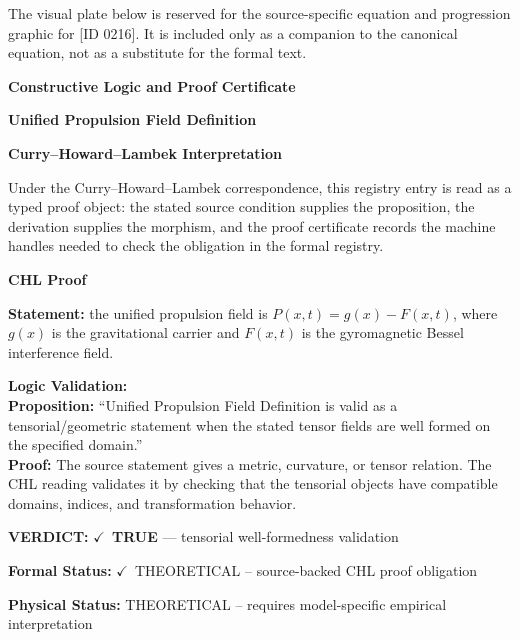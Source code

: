 \begingroup\footnotesize\sloppy
The visual plate below is reserved for the source-specific equation and progression graphic for [ID 0216]. It is included only as a companion to the canonical equation, not as a substitute for the formal text.
\par\endgroup
\ifTZPDarkEdition
{}
\fi

\clearpage
\begingroup\tzpsupportsetup
\noindent\textbf{\fontsize{10.8pt}{12.8pt}\selectfont [ID 0216] Constructive Logic and Proof Certificate}\par
\noindent\textbf{\fontsize{10pt}{12pt}\selectfont Unified Propulsion Field Definition}\par
\vspace{0.45em}
\begingroup
\footnotesize
\setlength{\parskip}{0.22em}
\setlength{\parindent}{0pt}
\noindent\textbf{Curry--Howard--Lambek Interpretation}\par
Under the Curry--Howard--Lambek correspondence, this registry entry is read as a typed proof
object: the stated source condition supplies the proposition, the derivation supplies the
morphism, and the proof certificate records the machine handles needed to check the obligation
in the formal registry.

\vspace{0.45em}
\noindent\textbf{CHL Proof}\par
\textbf{Statement:} the unified propulsion field is \(P(x,t)=g(x)-F(x,t)\), where \(g(x)\) is the gravitational carrier and \(F(x,t)\) is the gyromagnetic Bessel interference field.

\textbf{Logic Validation:}\\
\textbf{Proposition:} ``Unified Propulsion Field Definition is valid as a tensorial/geometric statement when the
stated tensor fields are well formed on the specified domain.''\\
\textbf{Proof:} The source statement gives a metric, curvature, or tensor relation. The CHL reading
validates it by checking that the tensorial objects have compatible domains, indices,
and transformation behavior.

\textbf{VERDICT:} \ensuremath{\checkmark}\ \textbf{TRUE} --- tensorial well-formedness validation

\textbf{Formal Status:} \ensuremath{\checkmark}\ THEORETICAL -- source-backed CHL proof obligation

\textbf{Physical Status:} THEORETICAL -- requires model-specific empirical interpretation
\par\vspace{0.45em}
\par
\ifTZPDarkEdition
{}
\fi
\endgroup
\endgroup
